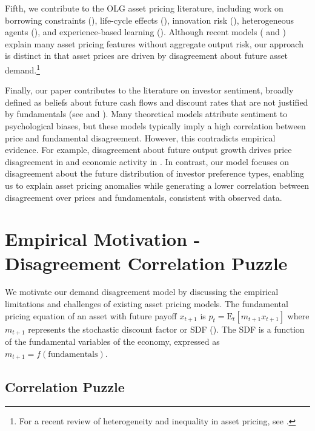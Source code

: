 \documentclass[preprint,11pt,authoryear]{elsarticle}
\theoremstyle{plain}
\begin{document}
Fifth, we contribute to the OLG asset pricing literature, including work on borrowing constraints (\cite{ConstantinidesDonaldsonMehra2002}), life-cycle effects (\cite{GOMES05}), innovation risk (\cite{GarlenauKoganPanageas2012}), heterogeneous agents (\cite{Garleanu2008}), and experience-based learning (\cite{EGH18}). Although recent models (\cite{GPcoordination:2021} and  \cite{GarlenauPanageas2023JPE}) explain many asset pricing features without aggregate output risk, our approach is distinct in that asset prices are driven by disagreement about future asset demand.\footnote{For a recent review of heterogeneity and inequality in asset pricing, see \cite{panageas:2020}.} 


Finally, our paper contributes to the literature on investor sentiment, broadly defined as beliefs about future cash flows and discount rates that are not justified by fundamentals (see \cite{BakerWurgler2007} and \cite{Zhou2018}). Many theoretical models attribute sentiment to psychological biases, but these models typically imply a high correlation between price and fundamental disagreement. However, this contradicts empirical evidence. For example, disagreement about future output growth drives price disagreement in \cite{Dumas2009} and economic activity in \cite{AngeletosLao2013}. In contrast, our model focuses on disagreement about the future distribution of investor preference types, enabling us to explain asset pricing anomalies while generating a lower correlation between disagreement over prices and fundamentals, consistent with observed data.


\section{Empirical Motivation - Disagreement Correlation Puzzle}\label{sec:empirics}

We motivate our demand disagreement model by discussing the empirical limitations and challenges of existing asset pricing models. The fundamental pricing equation of an asset with future payoff $x_{t+1}$ is $p_t = \mathrm{E}_t \left[ m_{t+1} x_{t+1} \right]$ 
where $m_{t+1}$ represents the stochastic discount factor or SDF (\cite{Cochrane2005}). The SDF is a function of the fundamental variables of the economy, expressed as $m_{t+1}  = f\left( \text{fundamentals}\right)$. 


\subsection{Correlation Puzzle}
\end{document}
